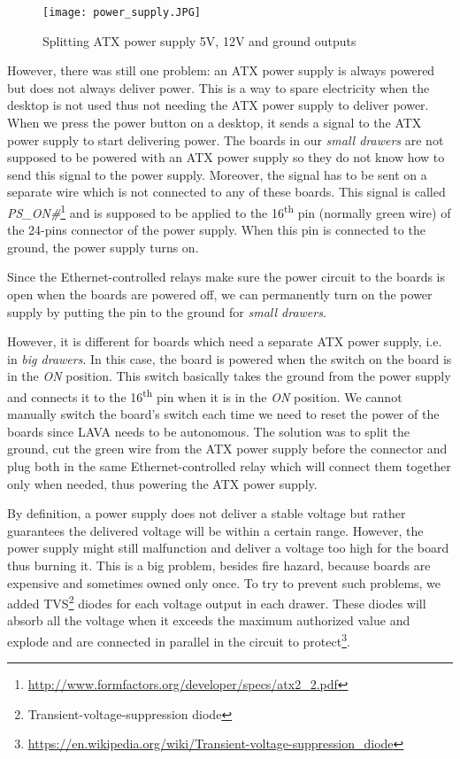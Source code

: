 \begin{figure}[H]
  \texttt{[image: power\_supply.JPG]}
  \caption{Splitting ATX power supply 5V, 12V and ground outputs}
\end{figure}

However, there was still one problem: an ATX power supply is always powered but does not always deliver power. This is a way to spare electricity when the desktop is not used thus not needing the ATX power supply to deliver power. When we press the power button on a desktop, it sends a signal to the ATX power supply to start delivering power. The boards in our \textit{small drawers} are not supposed to be powered with an ATX power supply so they do not know how to send this signal to the power supply. Moreover, the signal has to be sent on a separate wire which is not connected to any of these boards. This signal is called \textit{PS\_ON\#}\footnote{\url{http://www.formfactors.org/developer/specs/atx2\_2.pdf}} and is supposed to be applied to the 16\textsuperscript{th} pin (normally green wire) of the 24-pins connector of the power supply. When this pin is connected to the ground, the power supply turns on.

Since the Ethernet-controlled relays make sure the power circuit to the boards is open when the boards are powered off, we can permanently turn on the power supply by putting the pin to the ground for \textit{small drawers}.

However, it is different for boards which need a separate ATX power supply, i.e. in \textit{big drawers}. In this case, the board is powered when the switch on the board is in the \textit{ON} position. This switch basically takes the ground from the power supply and connects it to the 16\textsuperscript{th} pin when it is in the \textit{ON} position. We cannot manually switch the board's switch each time we need to reset the power of the boards since LAVA needs to be autonomous. The solution was to split the ground, cut the green wire from the ATX power supply before the connector and plug both in the same Ethernet-controlled relay which will connect them together only when needed, thus powering the ATX power supply.

By definition, a power supply does not deliver a stable voltage but rather guarantees the delivered voltage will be within a certain range. However, the power supply might still malfunction and deliver a voltage too high for the board thus burning it. This is a big problem, besides fire hazard, because boards are expensive and sometimes owned only once. To try to prevent such problems, we added TVS\footnote{Transient-voltage-suppression diode} diodes for each voltage output in each drawer. These diodes will absorb all the voltage when it exceeds the maximum authorized value and explode and are connected in parallel in the circuit to protect\footnote{\url{https://en.wikipedia.org/wiki/Transient-voltage-suppression\_diode}}.

